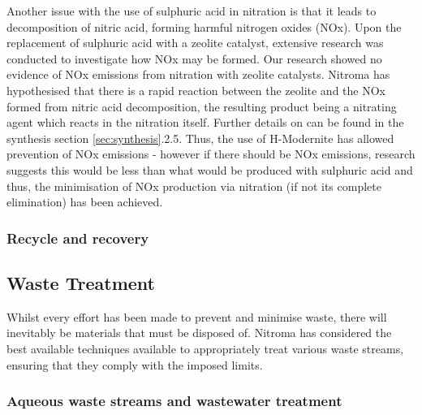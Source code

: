 Another issue with the use of sulphuric acid in nitration is that it leads to decomposition of nitric acid, forming harmful nitrogen oxides (NOx). Upon the replacement of sulphuric acid with a zeolite catalyst, extensive research was conducted to investigate how NOx may be formed. Our research showed no evidence of NOx emissions from nitration with zeolite catalysts. Nitroma has hypothesised that there is a rapid reaction between the zeolite and the NOx formed from nitric acid decomposition, the resulting product being a nitrating agent which reacts in the nitration itself. Further details on can be found in the synthesis section \ref{sec:synthesis}.2.5. Thus, the use of H-Modernite has allowed prevention of NOx emissions - however if there should be NOx emissions, research suggests this would be less than what would be produced with sulphuric acid and thus, the minimisation of NOx production via nitration (if not its complete elimination) has been achieved.  

\subsubsection{Recycle and recovery}


 






\subsection{Waste Treatment}

Whilst every effort has been made to prevent and minimise waste, there will inevitably be materials that must be disposed of. Nitroma has considered the best available techniques available to appropriately treat various waste streams, ensuring that they comply with the imposed limits.  

\subsubsection{Aqueous waste streams and wastewater treatment}


